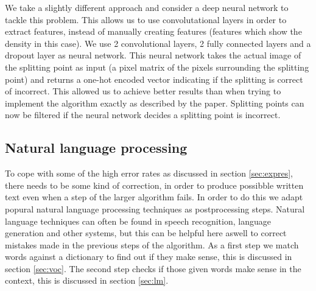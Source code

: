 \documentclass{article}
\begin{document}
We take a slightly different approach and consider a deep neural network to tackle this problem. This allows us to use convolutational layers in order to extract features, instead of manually creating features (features which show the density in this case). We use 2 convolutional layers, 2 fully connected layers and a dropout layer as neural network. This neural network takes the actual image of the splitting point as input (a pixel matrix of the pixels surrounding the splitting point) and returns a one-hot encoded vector indicating if the splitting is correct of incorrect. This allowed us to achieve better results than when trying to implement the algorithm exactly as described by the paper. Splitting points can now be filtered if the neural network decides a splitting point is incorrect. 


\subsection{Natural language processing}
To cope with some of the high error rates as discussed in section \ref{sec:expres}, there needs to be some kind of correction, in order to produce possibble written text even when a step of the larger algorithm fails. In order to do this we adapt popural natural language processing techniques as postprocessing steps. Natural language techniques can often be found in speech recognition, language generation and other systems, but this can be helpful here aswell to correct mistakes made in the previous steps of the algorithm. As a first step we match words against a dictionary to find out if they make sense, this is discussed in section \ref{sec:voc}. The second step checks if those given words make sense in the context, this is discussed in section \ref{sec:lm}.
\end{document}
